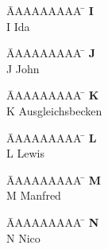 \vspace*{-1.5cm}
\begin{tabbing}
	\hspace{0.0cm}  \= AAAAAAAAA \=       \hspace{2cm} \kill
	\>\textbf{I} 	\> \\
	\>I 			\>  Ida\\
\end{tabbing} 

\vspace*{-1.5cm}
\begin{tabbing}
	\hspace{0.0cm}  \= AAAAAAAAA \=       \hspace{2cm} \kill
	\>\textbf{J} 	\> \\
	\>J 			\>  John\\
\end{tabbing}

\vspace*{-1.5cm}
\begin{tabbing}
	\hspace{0.0cm}  \= AAAAAAAAA \=       \hspace{2cm} \kill
	\>\textbf{K} 	\> \\
	\>K 			\>  Ausgleichsbecken\\
\end{tabbing}

\vspace*{-1.5cm}
\begin{tabbing}
	\hspace{0.0cm}  \= AAAAAAAAA \=       \hspace{2cm} \kill
	\>\textbf{L} 	\> \\
	\>L 			\>  Lewis\\
\end{tabbing}

\vspace*{-1.5cm}
\begin{tabbing}
	\hspace{0.0cm}  \= AAAAAAAAA \=       \hspace{2cm} \kill
	\>\textbf{M} 	\> \\
	\>M 			\>  Manfred\\
\end{tabbing} 

\vspace*{-1.5cm}
\begin{tabbing}
	\hspace{0.0cm}  \= AAAAAAAAA \=       \hspace{2cm} \kill
	\>\textbf{N} 	\> \\
	\>N 			\>  Nico\\
\end{tabbing}

